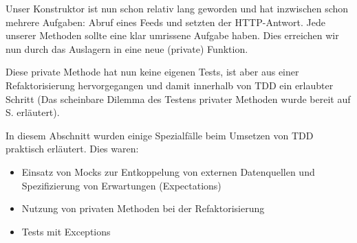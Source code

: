 \tddrefactor

Unser Konstruktor ist nun schon relativ lang geworden und hat inzwischen schon mehrere Aufgaben: Abruf eines Feeds und setzten der HTTP-Antwort. Jede unserer Methoden sollte eine klar umrissene Aufgabe haben. Dies erreichen wir nun durch das Auslagern in eine neue (private) Funktion.

\begin{ruby}[label=lib/imported\_job.rb]
 
    
    
      
     
      
   
          

   
      
      
      
\end{ruby}

Diese private Methode hat nun keine eigenen Tests, ist aber aus einer Refaktorisierung hervorgegangen und damit innerhalb von TDD ein erlaubter Schritt (Das scheinbare Dilemma des Testens privater Methoden wurde bereit auf S. \pageref{sec:tddspecialcircumstances} erläutert).


In diesem Abschnitt wurden einige Spezialfälle beim Umsetzen von TDD praktisch erläutert. Dies waren:
\begin{itemize}
 \item Einsatz von Mocks zur Entkoppelung von externen Datenquellen und Spezifizierung von Erwartungen (Expectations)
 \item Nutzung von privaten Methoden bei der Refaktorisierung
 \item Tests mit Exceptions
\end{itemize}
